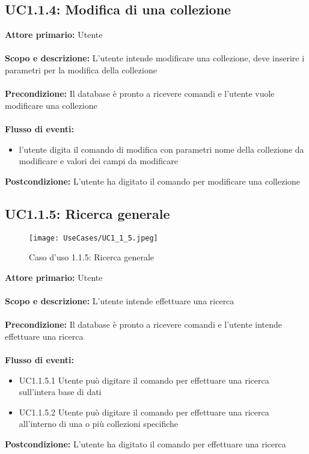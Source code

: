 \documentclass{scalatekids-article}
\begin{document}
\subsection{UC1.1.4: Modifica di una collezione}
\textbf{Attore primario:} Utente \\ \\
\textbf{Scopo e descrizione:} L’utente intende modificare una collezione, deve inserire i parametri per la modifica della collezione\\ \\
\textbf{Precondizione:} Il database è pronto a ricevere comandi e l’utente vuole modificare una collezione\\ \\
\textbf{Flusso di eventi:}
\begin{itemize}
\item l’utente digita il comando di modifica con parametri nome della collezione da modificare e valori dei campi da modificare
\end{itemize}
\textbf{Postcondizione:} L’utente ha digitato il comando per modificare una collezione
\subsection{UC1.1.5: Ricerca generale}
\begin{figure}[H]
  \texttt{[image: UseCases/UC1\_1\_5.jpeg]}
  \caption{Caso d'uso 1.1.5: Ricerca generale}
\end{figure}
\textbf{Attore primario:} Utente \\ \\
\textbf{Scopo e descrizione:} L’utente intende effettuare una ricerca\\ \\
\textbf{Precondizione:} Il database è pronto a ricevere comandi e l’utente intende effettuare una ricerca\\ \\
\textbf{Flusso di eventi:}
\begin{itemize}
\item UC1.1.5.1 Utente può digitare il comando per effettuare una ricerca sull’intera base di dati
\item UC1.1.5.2 Utente può digitare il comando per effettuare una ricerca all’interno di una o più collezioni specifiche
\end{itemize}
\textbf{Postcondizione:} L’utente ha digitato il comando per effettuare una ricerca
\end{document}
